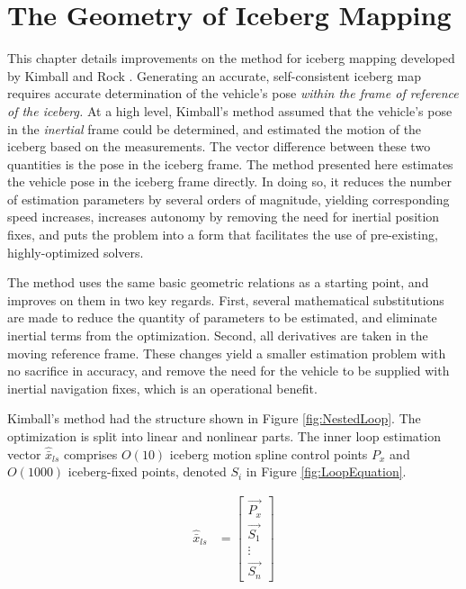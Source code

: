
\chapter{The Geometry of Iceberg Mapping}
\label{ch.IcebergGeometry}

This chapter details improvements on the method for iceberg mapping developed by Kimball and Rock \cite{}. Generating an accurate, self-consistent iceberg map requires accurate determination of the vehicle's pose \emph{within the frame of reference of the iceberg.} At a high level, Kimball's method assumed that the vehicle's pose in the \emph{inertial} frame could be determined, and estimated the motion of the iceberg based on the measurements. The vector difference between these two quantities is the pose in the iceberg frame. The method presented here estimates the vehicle pose in the iceberg frame directly. In doing so, it reduces the number of estimation parameters by several orders of magnitude, yielding corresponding speed increases, increases autonomy by removing the need for inertial position fixes, and puts the problem into a form that facilitates the use of pre-existing, highly-optimized solvers.

The method uses the same basic geometric relations as a starting point, and improves on them in two key regards. First, several mathematical substitutions are made to reduce the quantity of parameters to be estimated, and eliminate inertial terms from the optimization. Second, all derivatives are taken in the moving reference frame. These changes yield a smaller estimation problem with no sacrifice in accuracy, and remove the need for the vehicle to be supplied with inertial navigation fixes, which is an operational benefit.

Kimball's method had the structure shown in Figure \ref{fig:NestedLoop}. The optimization is split into linear and nonlinear parts. The inner loop estimation vector $\hat{\bar{x}}_{ls}$ comprises $O(10)$ iceberg motion spline control points $P_x$ and $O(1000)$ iceberg-fixed points, denoted $S_i$ in Figure \ref{fig:LoopEquation}.

\begin{align}
\hat{\bar{x}}_{ls} &= 
        \left[\begin{array}{c}
        \vec{P_x}\\
        \vec{S_1}\\
        \vdots\\
        \vec{S_n}
        \end{array}
        \right]
\end{align}

